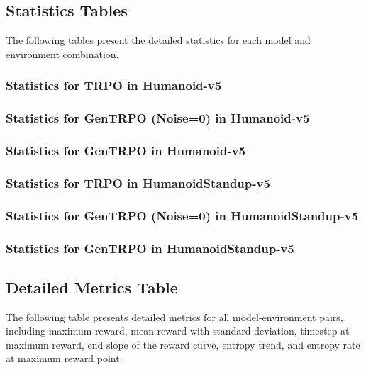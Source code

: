 \documentclass{svproc}
\begin{document}
\subsection{Statistics Tables}
The following tables present the detailed statistics for each model and environment combination.

\subsubsection{Statistics for TRPO in Humanoid-v5}


\subsubsection{Statistics for GenTRPO (Noise=0) in Humanoid-v5}


\subsubsection{Statistics for GenTRPO in Humanoid-v5}


\subsubsection{Statistics for TRPO in HumanoidStandup-v5}


\subsubsection{Statistics for GenTRPO (Noise=0) in HumanoidStandup-v5}


\subsubsection{Statistics for GenTRPO in HumanoidStandup-v5}


\subsection{Detailed Metrics Table}
The following table presents detailed metrics for all model-environment pairs, including maximum reward, mean reward with standard deviation, timestep at maximum reward, end slope of the reward curve, entropy trend, and entropy rate at maximum reward point.
\end{document}

